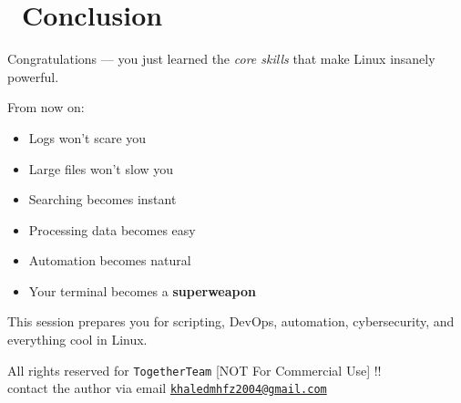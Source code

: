 \documentclass[12pt]{article}
\newcommand{\celebrationicon}{\faTrophy}
\begin{document}
\section*{\celebrationicon\ Conclusion}

Congratulations — you just learned the \textit{core skills} that make Linux insanely powerful.

From now on:

\begin{itemize}
    \item Logs won't scare you
    \item Large files won't slow you
    \item Searching becomes instant
    \item Processing data becomes easy
    \item Automation becomes natural
    \item Your terminal becomes a \textbf{superweapon}
\end{itemize}

\begin{highlightbox}
This session prepares you for scripting, DevOps, automation, cybersecurity, and everything cool in Linux.
\end{highlightbox}

\vspace{\fill}
\begin{center}
\color{muted}
All rights reserved for \texttt{TogetherTeam} [NOT For Commercial Use] !!\\
contact the author via email \href{mailto:khaledmhfz2004@gmail.com}{\texttt{khaledmhfz2004@gmail.com}}
\end{center}
\end{document}
